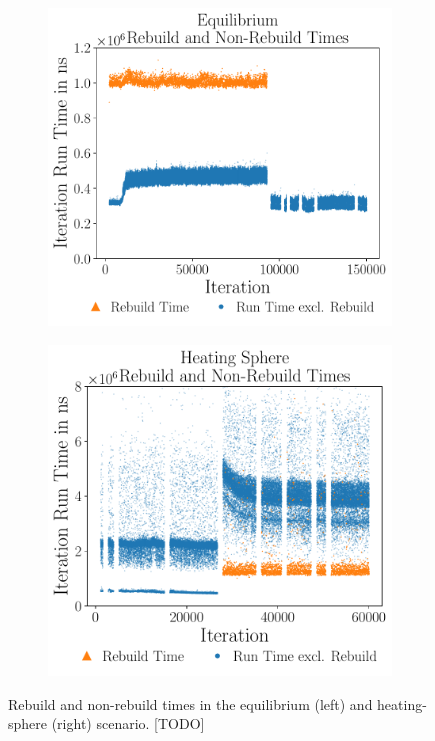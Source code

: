 \begin{figure}[htpb]
	\begin{subfigure}{0.5\textwidth}
		\centering
		\includegraphics[width=\textwidth]{./Figures/plots/equilibrium_rebuild.pdf}
	\end{subfigure}
	\begin{subfigure}{0.5\textwidth}
		\centering
		\includegraphics[width=\textwidth]{./Figures/plots/hs_rebuild.pdf}
	\end{subfigure}
	\caption{Rebuild and non-rebuild times in the equilibrium (left) and heating-sphere (right) scenario. [TODO]}
	\label{fig:rebuild_times}
\end{figure}



